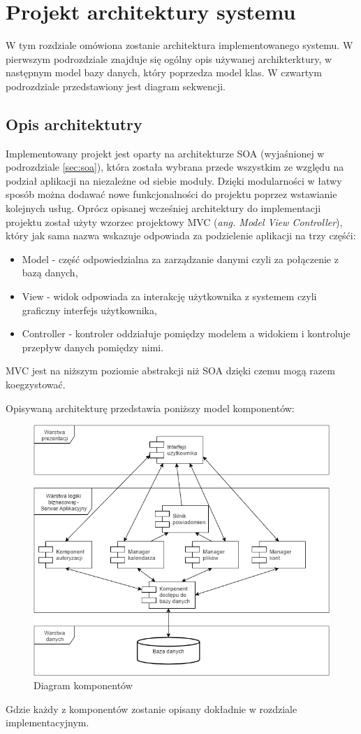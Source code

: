 \chapter{Projekt architektury systemu}
\label{cha:projektSystemu}
W tym rozdziale omówiona zostanie architektura implementowanego systemu. W pierwszym podrozdziale znajduje się ogólny opis używanej archikterktury, w następnym model bazy danych, który poprzedza model klas. W czwartym podrozdziale przedstawiony jest diagram sekwencji.
\section{Opis architektutry}
Implementowany projekt jest oparty na architekturze SOA (wyjaśnionej w podrozdziale \ref{sec:soa}), która została wybrana przede wszystkim ze względu na podział aplikacji na niezależne od siebie moduły. Dzięki modularności w łatwy sposób można dodawać nowe funkcjonalności do projektu poprzez wstawianie kolejnych usług. Oprócz opisanej wcześniej architektury do implementacji projektu został użyty wzorzec projektowy MVC (\textit{ang. Model View Controller}), który jak sama nazwa wskazuje odpowiada za podzielenie aplikacji na trzy częśći:
\begin{itemize}
	\item Model - część odpowiedzialna za zarządzanie danymi czyli za połączenie z bazą danych,
	\item View - widok odpowiada za interakcję użytkownika z systemem czyli graficzny interfejs użytkownika,
	\item Controller - kontroler oddziałuje pomiędzy modelem a widokiem i kontroluje przepływ danych pomiędzy nimi. \cite{MVC01}
\end{itemize}
MVC jest na niższym poziomie abstrakcji niż SOA dzięki czemu mogą razem koegzystować. 

Opisywaną architekturę przedstawia poniższy model komponentów:
\begin{figure}[H]
\centering
\includegraphics[scale=0.5]{ArchitekturaSystemu}
\caption{\label{fig:diag_01}Diagram komponentów}
\end{figure}
Gdzie każdy z komponentów zostanie opisany dokładnie w rozdziale implementacyjnym.

